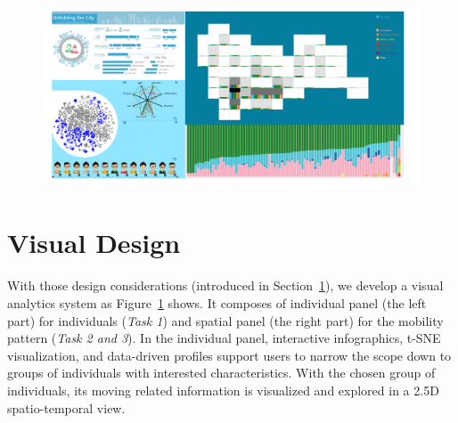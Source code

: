 \begin{figure}[htb!]
 \centering %
 \includegraphics[width=\linewidth]{pictures/interface53}
 \caption{}
 \label{fig:interfaceDraft}
\end{figure}



\section{Visual Design}

With those design considerations (introduced in Section~\ref{}), we develop a visual analytics system as Figure~\ref{fig:interfaceDraft} shows. It composes of individual panel (the left part) for individuals (\textit{Task 1}) and spatial panel (the right part) for the mobility pattern (\textit{Task 2 and 3}). In the individual panel, interactive infographics, t-SNE visualization, and data-driven profiles support users to narrow the scope down to groups of individuals with interested characteristics. With the chosen group of individuals, its moving related information is visualized and explored in a 2.5D spatio-temporal view. 




